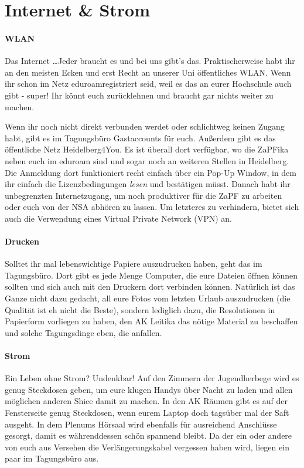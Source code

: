 
\section{Internet \& Strom}
\paragraph{WLAN}
Das Internet \dots Jeder braucht es und bei uns gibt's das. Praktischerweise habt ihr an den meisten Ecken und erst Recht an unserer Uni öffentliches WLAN. Wenn ihr schon im Netz \glqq eduroam\grqq registriert seid, weil es das an eurer Hochschule auch gibt - super! Ihr könnt euch zurücklehnen und braucht gar nichts weiter zu machen.

Wenn ihr noch nicht direkt verbunden werdet oder schlichtweg keinen Zugang habt, gibt es im Tagungsbüro Gastaccounts für euch. Außerdem gibt es das öffentliche Netz \glqq Heidelberg4You\grqq. Es ist überall dort verfügbar, wo die ZaPFika neben euch im \glqq eduroam\grqq{} sind und sogar noch an weiteren Stellen in Heidelberg. Die Anmeldung dort funktioniert recht einfach über ein Pop-Up Window, in dem ihr einfach die Lizenzbedingungen \textit{lesen} und bestätigen müsst. Danach habt ihr unbegrenzten Internetzugang, um noch produktiver für die ZaPF zu arbeiten oder euch von der NSA abhören zu lassen. Um letzteres zu verhindern, bietet sich auch die Verwendung eines Virtual Private Network (VPN) an.

\paragraph{Drucken}
Solltet ihr mal lebenswichtige Papiere auszudrucken haben, geht das im Tagungsbüro. Dort gibt es jede Menge Computer, die eure Dateien öffnen können sollten und sich auch mit den Druckern dort verbinden können. Natürlich ist das Ganze nicht dazu gedacht, all eure Fotos vom letzten Urlaub auszudrucken (die Qualität ist eh nicht die Beste), sondern lediglich dazu, die Resolutionen in Papierform vorliegen zu haben, den AK Leitika das nötige Material zu beschaffen und solche Tagungsdinge eben, die anfallen.

\paragraph{Strom}
Ein Leben ohne Strom? Undenkbar! Auf den Zimmern der Jugendherbege wird es genug Steckdosen geben, um eure klugen Handys über Nacht zu laden und allen möglichen anderen Shice damit zu machen. In den AK Räumen gibt es auf der Fensterseite genug Steckdosen, wenn eurem Laptop doch tagsüber mal der Saft ausgeht. In dem Plenums Hörsaal wird ebenfalls für ausreichend Anschlüsse gesorgt, damit es währenddessen schön spannend bleibt. Da der ein oder andere von euch aus Versehen die Verlängerungskabel vergessen haben wird, liegen ein paar im Tagungsbüro aus.
